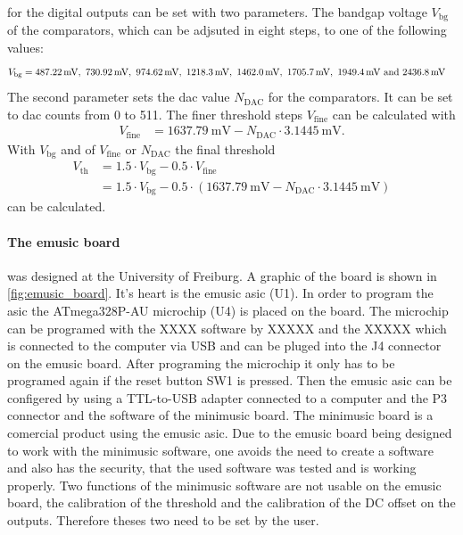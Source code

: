  for the digital outputs can be set with two parameters.
The bandgap voltage $V_\text{bg}$ of the comparators, which can be adjsuted in eight steps, to one of the following values:
\begin{align}
	V_\text{bg}&=\SIlist{487.22;730.92;974.62;1218.3;1462.0;1705.7;1949.4;2436.8}{\milli\volt}
\end{align}
The second parameter sets the \ac{dac} value $N_\text{DAC}$ for the comparators.
It can be set to \ac{dac} counts from 0 to 511.
The finer threshold steps $V_\text{fine}$ can be calculated with
\begin{align}
	V_\text{fine}&=\SI{1637.79}{\milli\volt} - N_\text{DAC}\cdot\SI{3.1445}{\milli\volt}.
\end{align}
With $V_\text{bg}$ and  of $V_\text{fine}$ or $N_\text{DAC}$ the final threshold
\begin{align}
	V_\text{th}&= 1.5\cdot V_\text{bg} - 0.5\cdot V_\text{fine}\\
		   &= 1.5\cdot V_\text{bg} - 0.5\cdot (\SI{1637.79}{\milli\volt} - N_\text{DAC}\cdot\SI{3.1445}{\milli\volt})
\end{align}
can be calculated.

\paragraph{The \ac{emusic} board} was designed at the University of Freiburg.
A graphic of the board is shown in \autoref{fig:emusic_board}.
It's heart is the \ac{emusic} \ac{asic} (U1).
In order to program the \ac{asic} the ATmega328P-AU microchip (U4) is placed on the board.
The microchip can be programed with the XXXX software by XXXXX and the XXXXX which is connected to the computer via USB and can be pluged into the J4 connector on the \ac{emusic} board.
After programing the microchip it only has to be programed again if the reset button SW1 is pressed.
Then the \ac{emusic} \ac{asic} can be configered by using a TTL-to-USB adapter connected to a computer and the P3 connector and the software of the minimusic board.
The minimusic board is a comercial product using the \ac{emusic} \ac{asic}.
Due to the \ac{emusic} board being designed to work with the minimusic software, one avoids the need to create a software and also has the security, that the used software was tested and is working properly.
Two functions of the minimusic software are not usable on the \ac{emusic} board, the calibration of the threshold and the calibration of the DC offset on the outputs.
Therefore theses two need to be set by the user.

